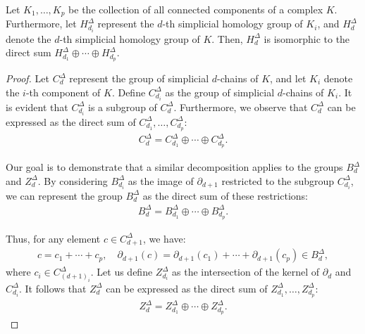 \begin{proposition}{\cite[Proposition 2.6]{hatcher2005algebraic}}
	Let \( K_{1}, \ldots, K_{p} \) be the collection of all connected components of a complex \( K \). Furthermore, let \( H^{\Delta}_{d_i} \) represent the \( d \)-th simplicial homology group of \( K_{i} \), and \( H^{\Delta}_{d} \) denote the \( d \)-th simplicial homology group of \( K \). Then, \( H^{\Delta}_{d} \) is isomorphic to the direct sum \( H^{\Delta}_{d_1} \oplus \cdots \oplus H^{\Delta}_{d_p} \).
\end{proposition}

\begin{proof}
	Let \( C^{\Delta}_{d} \) represent the group of simplicial \( d \)-chains of \( K \), and let \( K_{i} \) denote the \( i \)-th component of \( K \). Define \( C^{\Delta}_{d_i} \) as the group of simplicial \( d \)-chains of \( K_{i} \). It is evident that \( C^{\Delta}_{d_i} \) is a subgroup of \( C^{\Delta}_{d} \). Furthermore, we observe that \( C^{\Delta}_{d} \) can be expressed as the direct sum of \( C^{\Delta}_{d_1}, \ldots, C^{\Delta}_{d_p} \):
	\begin{align}
		C^{\Delta}_{d} = C^{\Delta}_{d_1} \oplus \cdots \oplus C^{\Delta}_{d_p}. 
	\end{align}
				
	Our goal is to demonstrate that a similar decomposition applies to the groups \( B^{\Delta}_{d} \) and \( Z^{\Delta}_{d} \). By considering \( B^{\Delta}_{d_i} \) as the image of \( \partial_{d+1} \) restricted to the subgroup \( C^{\Delta}_{d_i} \), we can represent the group \( B^{\Delta}_{d} \) as the direct sum of these restrictions:
	\begin{align}
		B^{\Delta}_{d} = B^{\Delta}_{d_1} \oplus \cdots \oplus B^{\Delta}_{d_p}. 
	\end{align}
				
	Thus, for any element \( c \in C^{\Delta}_{d+1} \), we have:
	\begin{align}
		c = c_{1} + \cdots + c_{p}, \quad \partial_{d+1}(c) = \partial_{d+1}(c_{1}) + \cdots + \partial_{d+1}(c_{p}) \in B^{\Delta}_{d}, 
	\end{align}
	where \( c_{i} \in C^{\Delta}_{(d+1)_i} \). Let us define \( Z^{\Delta}_{d_i} \) as the intersection of the kernel of \( \partial_{d} \) and \( C^{\Delta}_{d_i} \). It follows that \( Z^{\Delta}_{d} \) can be expressed as the direct sum of \( Z^{\Delta}_{d_1}, \ldots, Z^{\Delta}_{d_p} \):
	\begin{align}
		Z^{\Delta}_{d} = Z^{\Delta}_{d_1} \oplus \cdots \oplus Z^{\Delta}_{d_p}. 
	\end{align}
				

\end{proof}
